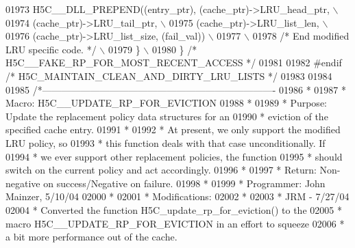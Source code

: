 \begin{DoxyCode}
01973 \textcolor{preprocessor}{        H5C\_\_DLL\_PREPEND((entry\_ptr), (cache\_ptr)->LRU\_head\_ptr,            \(\backslash\)}
01974 \textcolor{preprocessor}{                         (cache\_ptr)->LRU\_tail\_ptr,                         \(\backslash\)}
01975 \textcolor{preprocessor}{             (cache\_ptr)->LRU\_list\_len,                         \(\backslash\)}
01976 \textcolor{preprocessor}{                         (cache\_ptr)->LRU\_list\_size, (fail\_val))            \(\backslash\)}
01977 \textcolor{preprocessor}{                                                                            \(\backslash\)}
01978 \textcolor{preprocessor}{        }\textcolor{comment}{/* End modified LRU specific code. */}\textcolor{preprocessor}{                               \(\backslash\)}
01979 \textcolor{preprocessor}{    \}                                                                       \(\backslash\)}
01980 \textcolor{preprocessor}{\} }\textcolor{comment}{/* H5C\_\_FAKE\_RP\_FOR\_MOST\_RECENT\_ACCESS */}\textcolor{preprocessor}{}
01981 
01982 \textcolor{preprocessor}{#endif }\textcolor{comment}{/* H5C\_MAINTAIN\_CLEAN\_AND\_DIRTY\_LRU\_LISTS */}\textcolor{preprocessor}{}
01983 
01984 
01985 \textcolor{comment}{/*-------------------------------------------------------------------------}
01986 \textcolor{comment}{ *}
01987 \textcolor{comment}{ * Macro:   H5C\_\_UPDATE\_RP\_FOR\_EVICTION}
01988 \textcolor{comment}{ *}
01989 \textcolor{comment}{ * Purpose:     Update the replacement policy data structures for an}
01990 \textcolor{comment}{ *      eviction of the specified cache entry.}
01991 \textcolor{comment}{ *}
01992 \textcolor{comment}{ *      At present, we only support the modified LRU policy, so}
01993 \textcolor{comment}{ *      this function deals with that case unconditionally.  If}
01994 \textcolor{comment}{ *      we ever support other replacement policies, the function}
01995 \textcolor{comment}{ *      should switch on the current policy and act accordingly.}
01996 \textcolor{comment}{ *}
01997 \textcolor{comment}{ * Return:      Non-negative on success/Negative on failure.}
01998 \textcolor{comment}{ *}
01999 \textcolor{comment}{ * Programmer:  John Mainzer, 5/10/04}
02000 \textcolor{comment}{ *}
02001 \textcolor{comment}{ * Modifications:}
02002 \textcolor{comment}{ *}
02003 \textcolor{comment}{ *      JRM - 7/27/04}
02004 \textcolor{comment}{ *      Converted the function H5C\_update\_rp\_for\_eviction() to the}
02005 \textcolor{comment}{ *      macro H5C\_\_UPDATE\_RP\_FOR\_EVICTION in an effort to squeeze}
02006 \textcolor{comment}{ *      a bit more performance out of the cache.}

\end{DoxyCode}
